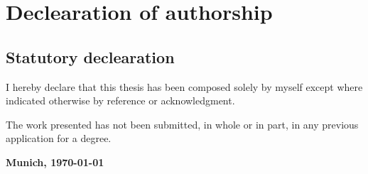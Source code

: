 \chapter*{Declearation of authorship}

\section*{Statutory declearation}

I hereby declare that this thesis has been composed solely by myself except
where indicated otherwise by reference or acknowledgment.

The work presented has not been submitted, in whole or in part, in any
previous application for a degree.

\vspace{1em}
\textbf{Munich, \today}
